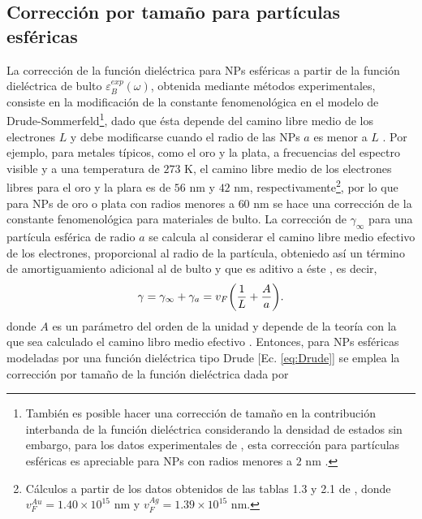 \subsection{Corrección por tamaño para partículas esféricas}

La corrección de la función dieléctrica para NPs esféricas a partir de la función dieléctrica de bulto $\varepsilon_B^{exp}(\omega)$, obtenida mediante métodos experimentales, consiste en la modificación de la constante fenomenológica en el modelo de Drude-Sommerfeld\footnote{También es posible hacer una corrección de tamaño en la contribución interbanda de la función dieléctrica considerando la densidad de estados sin embargo, para los datos experimentales de \cite{johnson1972constants}, esta corrección para partículas esféricas es apreciable para NPs con radios menores a $2$ nm \cite{mendoza2014determination}.}, dado que ésta depende del camino libre medio de los electrones $L$ y debe modificarse cuando el radio de las NPs $a$ es menor a $L$ \cite{kreibig1995clusters}. Por ejemplo, para metales típicos, como el oro y la plata, a frecuencias del espectro visible y a una temperatura de $273$ K, el camino libre medio de los electrones libres para el oro y la plara es  de $56$ nm  y $42$ nm, respectivamente\footnote{Cálculos a partir de los datos obtenidos de las tablas 1.3 y 2.1 de \cite{ashcroft1976solid}, donde $v_F^{Au} = 1.40\times 10^{15}$ nm y $v_F^{Ag}=1.39\times 10^{15}$ nm.}, por lo que para NPs de oro o plata con radios menores a $60$ nm se hace una corrección de la constante fenomenológica para materiales de bulto. La corrección de $\gamma_\infty$ para una partícula esférica de radio $a$ se calcula al considerar el camino libre medio efectivo de los electrones, proporcional al radio de la partícula, obteniedo así un término de amortiguamiento adicional al de bulto y que es aditivo a éste \cite{kreibig1995clusters}, es decir, 
	\begin{align*}
	 \gamma = \gamma_\infty + \gamma_a = v_F \qty(\frac{1}{L}+\frac{A}{a}). 
	\end{align*}
donde $A$ es un parámetro del orden de la unidad \cite{noguez2007surface,mendoza2014determination} y depende de la teoría con la que sea calculado el camino libro medio efectivo \cite{kreibig1995clusters}.  Entonces, para NPs esféricas modeladas por una función dieléctrica tipo Drude [Ec.  \eqref{eq:Drude}] se emplea  la corrección por tamaño de la función dieléctrica dada por 
